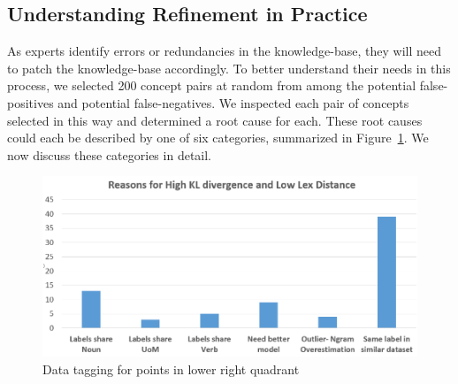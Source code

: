 


\subsection{Understanding Refinement in Practice}
As experts identify errors or redundancies in the knowledge-base, they will need to patch the knowledge-base accordingly.
To better understand their needs in this process, we selected 200  concept pairs at random from among the potential false-positives and potential false-negatives.
We inspected each pair of concepts selected in this way and determined a root cause for each.
These root causes could each be described by one of six categories, summarized in Figure~\ref{fig:datatags:lowerright}.
We now discuss these categories in detail.

\begin{figure}
	\centering
	\includegraphics[width=0.8\columnwidth]{graphics/Lower_right_quad}
	\caption{Data tagging for points in lower right quadrant}
	\label{fig:datatags:lowerright}
\end{figure}

